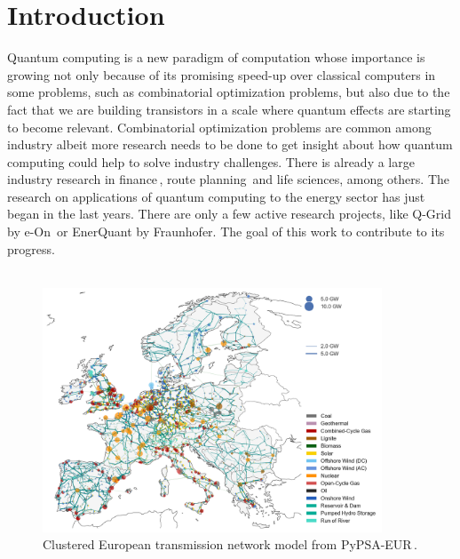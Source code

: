 
\chapter{Introduction} %

\label{Chapter1} %

%
%
Quantum computing is a new paradigm of computation whose importance is growing not only because of its promising speed-up over classical computers in some problems, such as combinatorial optimization problems, but also due to the fact that we are building transistors in a scale where quantum effects are starting to become relevant. Combinatorial optimization problems are common among industry albeit more research needs to be done to get insight about how quantum computing could help to solve industry challenges. There is already a large industry research in finance\,\cite{Herman2022AFinance}, route planning\,\cite{Tambunan2022QuantumSegment} and life sciences, among others. The research on applications of quantum computing to the energy sector has just began in the last years. There are only a few active research projects, like Q-Grid by e-On\,\cite{Fernandez-Campoamor2021CommunityAnnealing} or EnerQuant by Fraunhofer. The goal of this work to contribute to its progress.\\\\
\begin{figure}[H]
  \begin{center}
\includegraphics[width=0.9\textwidth]{Figures/Europe-Grid.png}
  \end{center}
  \caption{Clustered European transmission network model from PyPSA-EUR\,\cite{PyPSA-Eur:PyPSA-Eur}.}
\end{figure}
